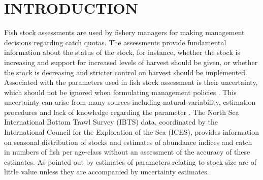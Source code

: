 \documentclass[a4paper 12pt]{article}
\numberwithin{equation}{section}
\begin{document}
\begin{abstract}



\end{abstract}


\clearpage
\section{\large INTRODUCTION}
Fish stock assessments are used by fishery managers for making management decisions regarding catch quotas. The assessments provide fundamental information about the status of the stock, for instance, whether the stock is increasing and support for increased levels of harvest should be given, or whether the stock is decreasing and stricter control on harvest should be implemented. Associated with the parameters used in fish stock assessment is their uncertainty, which should not be ignored when formulating management policies \citep{walters1981effects, ludwig1981measurement}. This uncertainty can arise from many sources including natural variability, estimation procedures and lack of knowledge regarding the parameter \citep{ehrhardt1997role}. The North Sea International Bottom Trawl Survey (IBTS) data, coordinated by the International Council for the Exploration of the Sea (ICES), provides information on seasonal distribution of stocks and estimates of abundance indices and catch in numbers of fish per age-class without an assessment of the accuracy of these estimates.  As pointed out by  \citet{ludwig1981measurement} estimates of parameters relating to stock size are of little value unless they are accompanied by uncertainty estimates. \\
\end{document}

